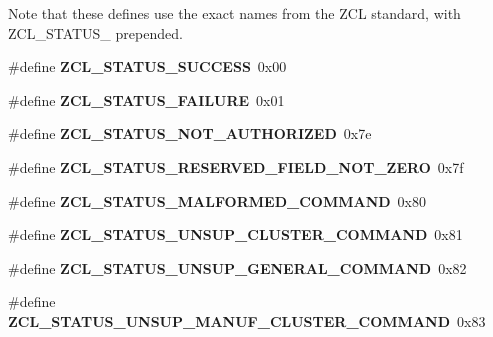 Note that these defines use the exact names from the Z\-C\-L standard, with Z\-C\-L\-\_\-\-S\-T\-A\-T\-U\-S\-\_\- prepended. \begin{DoxyCompactItemize}
\item 
\hypertarget{group__zcl_ga47e4ec72d1f3f241da408873d2666fdc}{\#define {\bfseries Z\-C\-L\-\_\-\-S\-T\-A\-T\-U\-S\-\_\-\-S\-U\-C\-C\-E\-S\-S}~0x00}\label{group__zcl_ga47e4ec72d1f3f241da408873d2666fdc}

\item 
\hypertarget{group__zcl_gaab010fd0ef9bd352f1ef9f97477f1ad1}{\#define {\bfseries Z\-C\-L\-\_\-\-S\-T\-A\-T\-U\-S\-\_\-\-F\-A\-I\-L\-U\-R\-E}~0x01}\label{group__zcl_gaab010fd0ef9bd352f1ef9f97477f1ad1}

\item 
\hypertarget{group__zcl_gaf0bc5736d44e407eda875155084ce22b}{\#define {\bfseries Z\-C\-L\-\_\-\-S\-T\-A\-T\-U\-S\-\_\-\-N\-O\-T\-\_\-\-A\-U\-T\-H\-O\-R\-I\-Z\-E\-D}~0x7e}\label{group__zcl_gaf0bc5736d44e407eda875155084ce22b}

\item 
\hypertarget{group__zcl_ga53669b6df991a0e56ca67823a5669f34}{\#define {\bfseries Z\-C\-L\-\_\-\-S\-T\-A\-T\-U\-S\-\_\-\-R\-E\-S\-E\-R\-V\-E\-D\-\_\-\-F\-I\-E\-L\-D\-\_\-\-N\-O\-T\-\_\-\-Z\-E\-R\-O}~0x7f}\label{group__zcl_ga53669b6df991a0e56ca67823a5669f34}

\item 
\hypertarget{group__zcl_ga597a075f762fba23016d89a6029122c8}{\#define {\bfseries Z\-C\-L\-\_\-\-S\-T\-A\-T\-U\-S\-\_\-\-M\-A\-L\-F\-O\-R\-M\-E\-D\-\_\-\-C\-O\-M\-M\-A\-N\-D}~0x80}\label{group__zcl_ga597a075f762fba23016d89a6029122c8}

\item 
\hypertarget{group__zcl_ga65af01126024e9e321d341767f6f96cb}{\#define {\bfseries Z\-C\-L\-\_\-\-S\-T\-A\-T\-U\-S\-\_\-\-U\-N\-S\-U\-P\-\_\-\-C\-L\-U\-S\-T\-E\-R\-\_\-\-C\-O\-M\-M\-A\-N\-D}~0x81}\label{group__zcl_ga65af01126024e9e321d341767f6f96cb}

\item 
\hypertarget{group__zcl_ga794bb528f7379a80b304d88ea3db9627}{\#define {\bfseries Z\-C\-L\-\_\-\-S\-T\-A\-T\-U\-S\-\_\-\-U\-N\-S\-U\-P\-\_\-\-G\-E\-N\-E\-R\-A\-L\-\_\-\-C\-O\-M\-M\-A\-N\-D}~0x82}\label{group__zcl_ga794bb528f7379a80b304d88ea3db9627}

\item 
\hypertarget{group__zcl_gae1c212c2db7f6bc3fde9e5f1720451f2}{\#define {\bfseries Z\-C\-L\-\_\-\-S\-T\-A\-T\-U\-S\-\_\-\-U\-N\-S\-U\-P\-\_\-\-M\-A\-N\-U\-F\-\_\-\-C\-L\-U\-S\-T\-E\-R\-\_\-\-C\-O\-M\-M\-A\-N\-D}~0x83}\label{group__zcl_gae1c212c2db7f6bc3fde9e5f1720451f2}


\end{DoxyCompactItemize}
